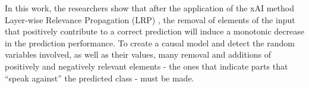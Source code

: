 

In this work, the researchers show that after the application of the xAI method Layer-wise Relevance Propagation (LRP) \cite{Bach:2015:LayerWiseRelevancePropagation}, the removal of elements of the input that positively contribute to a correct prediction will induce a monotonic decrease in the prediction performance. To create a causal model and detect the random variables involved, as well as their values, many removal and additions of positively and negatively relevant elements - the ones that indicate parts that ``speak against'' the predicted class - must be made. 






